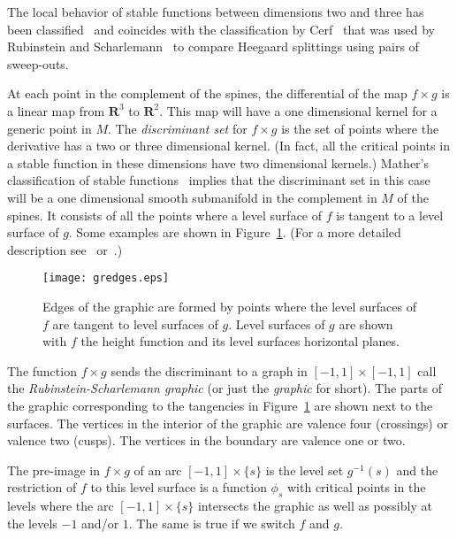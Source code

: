 \documentclass[12pt]{amsart}
\theoremstyle{plain}
\theoremstyle{definition}
\begin{document}
The local behavior of stable functions between dimensions two and three has been classified~\cite{mather} and coincides with the classification by Cerf~\cite{cerf:strat} that was used by Rubinstein and Scharlemann~\cite{rub:compar} to compare Heegaard splittings using pairs of sweep-outs.

At each point in the complement of the spines, the differential of the map $f \times g$ is a linear map from $\mathbf{R}^3$ to $\mathbf{R}^2$.  This map will have a one dimensional kernel for a generic point in $M$.  The \textit{discriminant set} for $f \times g$ is the set of points where the derivative has a two or three dimensional kernel.  (In fact, all the critical points in a stable function in these dimensions have two dimensional kernels.)  Mather's classification of stable functions~\cite{mather} implies that the discriminant set in this case will be a one dimensional smooth submanifold in the complement in $M$ of the spines.  It consists of all the points where a level surface of $f$ is tangent to a level surface of $g$.  Some examples are shown in Figure~\ref{grfig}.  (For a more detailed description see~\cite{Kob:disc} or~\cite{rub:compar}.)  
\begin{figure}[htb]
  \begin{center}
  \texttt{[image: gredges.eps]}
  \caption{Edges of the graphic are formed by points where the level surfaces of $f$ are tangent to level surfaces of $g$.  Level surfaces of $g$ are shown with $f$ the height function and its level surfaces horizontal planes.}
  \label{grfig}
  \end{center}
\end{figure}

The function $f \times g$ sends the discriminant to a graph in $[-1,1] \times [-1,1]$ call the \textit{Rubinstein-Scharlemann graphic} (or just the \textit{graphic} for short).  The parts of the graphic corresponding to the tangencies in Figure~\ref{grfig} are shown next to the surfaces.  The vertices in the interior of the graphic are valence four (crossings) or valence two (cusps).  The vertices in the boundary are valence one or two.

The pre-image in $f \times g$ of an arc $[-1,1] \times \{s\}$ is the level set $g^{-1}(s)$ and the restriction of $f$ to this level surface is a function $\phi_s$ with critical points in the levels where the arc $[-1,1] \times \{s\}$ intersects the graphic as well as possibly at the levels $-1$ and/or $1$.  The same is true if we switch $f$ and $g$.  
\end{document}

